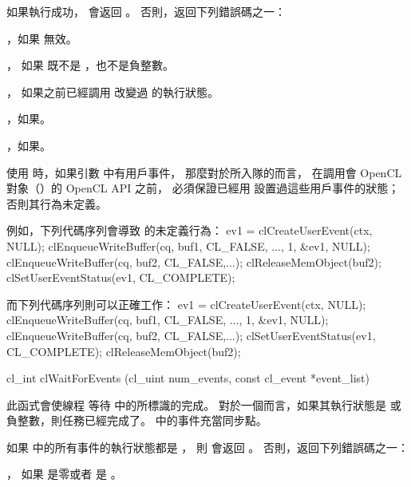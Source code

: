 如果執行成功，  會返回 。
否則，返回下列錯誤碼之一：
\startigBase
\item {}，如果  無效。

\item {}，
如果  既不是 ，也不是負整數。

\item {}，
如果之前已經調用  改變過  的執行狀態。

\item {}，如果\scdevfailres。

\item {}，如果\schostfailres。
\stopigBase

\startnotepar
使用  時，如果引數  中有用戶事件，
那麼對於所入隊的而言，
在調用會 OpenCL 對象（）的 OpenCL API 之前，
必須保證已經用  設置過這些用戶事件的狀態；
否則其行為未定義。

例如，下列代碼序列會導致  的未定義行為：
\startclc
ev1 = clCreateUserEvent(ctx, NULL);
clEnqueueWriteBuffer(cq, buf1, CL_FALSE, ...,
			1, &ev1, NULL);
clEnqueueWriteBuffer(cq, buf2, CL_FALSE,...);
clReleaseMemObject(buf2);
clSetUserEventStatus(ev1, CL_COMPLETE);
\stopclc

而下列代碼序列則可以正確工作：
\startclc
ev1 = clCreateUserEvent(ctx, NULL);
clEnqueueWriteBuffer(cq, buf1, CL_FALSE, ...,
			1, &ev1, NULL);
clEnqueueWriteBuffer(cq, buf2, CL_FALSE,...);
clSetUserEventStatus(ev1, CL_COMPLETE);
clReleaseMemObject(buf2);
\stopclc
\stopnotepar


\startCLFUNC
cl_int clWaitForEvents (cl_uint num_events,
		const cl_event *event_list)
\stopCLFUNC

此函式會使線程
等待  中的所標識的完成。
對於一個而言，如果其執行狀態是  或負整數，則任務已經完成了。
 中的事件充當同步點。

如果  中的所有事件的執行狀態都是 ，
則  會返回 。
否則，返回下列錯誤碼之一：
\startigBase
\item {}，
如果  是零或者  是 。

